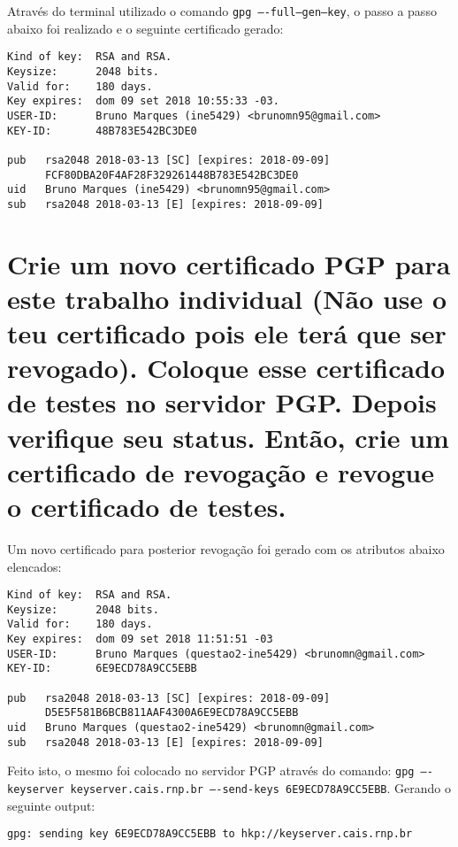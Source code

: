 \documentclass[
    article,            %
    11pt,               %
    oneside,            %
    a4paper,            %
    english,            %
    brazil,             %
    sumario=tradicional,
    ]{abntex2}
\begin{document}
Através do terminal utilizado o comando \texttt{gpg ----full--gen--key}, o passo a passo abaixo foi realizado e o seguinte certificado gerado:

\begin{Verbatim}[frame=single, commandchars=\\\{\}, fontsize=\footnotesize]
Kind of key:  RSA and RSA.
Keysize:      2048 bits.
Valid for:    180 days.
Key expires:  dom 09 set 2018 10:55:33 -03.
USER-ID:      Bruno Marques (ine5429) <brunomn95@gmail.com>
KEY-ID:       48B783E542BC3DE0
    
pub   rsa2048 2018-03-13 [SC] [expires: 2018-09-09]
      FCF80DBA20F4AF28F329261448B783E542BC3DE0
uid   Bruno Marques (ine5429) <brunomn95@gmail.com>
sub   rsa2048 2018-03-13 [E] [expires: 2018-09-09]
\end{Verbatim}

\section{Crie um novo certificado PGP para este trabalho individual (Não use o teu certificado pois ele terá que ser revogado). Coloque esse certificado de testes no servidor PGP. Depois verifique seu status. Então, crie um certificado de revogação e revogue o certificado de testes.}

Um novo certificado para posterior revogação foi gerado com os atributos abaixo elencados:

\begin{Verbatim}[frame=single, commandchars=\\\{\}, fontsize=\footnotesize]
Kind of key:  RSA and RSA.
Keysize:      2048 bits.
Valid for:    180 days.
Key expires:  dom 09 set 2018 11:51:51 -03
USER-ID:      Bruno Marques (questao2-ine5429) <brunomn@gmail.com>
KEY-ID:       6E9ECD78A9CC5EBB

pub   rsa2048 2018-03-13 [SC] [expires: 2018-09-09]
      D5E5F581B6BCB811AAF4300A6E9ECD78A9CC5EBB
uid   Bruno Marques (questao2-ine5429) <brunomn@gmail.com>
sub   rsa2048 2018-03-13 [E] [expires: 2018-09-09]
\end{Verbatim}

Feito isto, o mesmo foi colocado no servidor PGP através do comando: \texttt{gpg ----keyserver keyserver.cais.rnp.br ----send-keys 6E9ECD78A9CC5EBB}. Gerando o seguinte output:

\begin{Verbatim}[frame=single, commandchars=\\\{\}, fontsize=\footnotesize]
gpg: sending key 6E9ECD78A9CC5EBB to hkp://keyserver.cais.rnp.br
\end{Verbatim}
\end{document}
